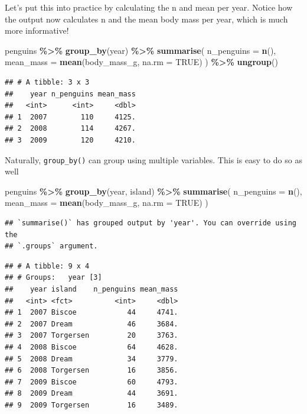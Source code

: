 \documentclass[
]{book}
\newenvironment{Shaded}{\begin{snugshade}}{\end{snugshade}}
\newcommand{\AttributeTok}[1]{\textcolor[rgb]{0.13,0.29,0.53}{#1}}
\newcommand{\ConstantTok}[1]{\textcolor[rgb]{0.56,0.35,0.01}{#1}}
\newcommand{\FunctionTok}[1]{\textcolor[rgb]{0.13,0.29,0.53}{\textbf{#1}}}
\newcommand{\NormalTok}[1]{#1}
\newcommand{\SpecialCharTok}[1]{\textcolor[rgb]{0.81,0.36,0.00}{\textbf{#1}}}
\begin{document}
Let's put this into practice by calculating the n and mean per year. Notice how the output now calculates n and the mean body mass per year, which is much more informative!

\begin{Shaded}
\begin{Highlighting}[]
\NormalTok{penguins }\SpecialCharTok{\%\textgreater{}\%}
  \FunctionTok{group\_by}\NormalTok{(year) }\SpecialCharTok{\%\textgreater{}\%}
  \FunctionTok{summarise}\NormalTok{(}
    \AttributeTok{n\_penguins =} \FunctionTok{n}\NormalTok{(),}
    \AttributeTok{mean\_mass =} \FunctionTok{mean}\NormalTok{(body\_mass\_g, }\AttributeTok{na.rm =} \ConstantTok{TRUE}\NormalTok{)}
\NormalTok{  ) }\SpecialCharTok{\%\textgreater{}\%}
  \FunctionTok{ungroup}\NormalTok{()}
\end{Highlighting}
\end{Shaded}

\begin{verbatim}
## # A tibble: 3 x 3
##    year n_penguins mean_mass
##   <int>      <int>     <dbl>
## 1  2007        110     4125.
## 2  2008        114     4267.
## 3  2009        120     4210.
\end{verbatim}

Naturally, \texttt{group\_by()} can group using multiple variables. This is easy to do so as well

\begin{Shaded}
\begin{Highlighting}[]
\NormalTok{penguins }\SpecialCharTok{\%\textgreater{}\%}
  \FunctionTok{group\_by}\NormalTok{(year, island) }\SpecialCharTok{\%\textgreater{}\%}
  \FunctionTok{summarise}\NormalTok{(}
    \AttributeTok{n\_penguins =} \FunctionTok{n}\NormalTok{(),}
    \AttributeTok{mean\_mass =} \FunctionTok{mean}\NormalTok{(body\_mass\_g, }\AttributeTok{na.rm =} \ConstantTok{TRUE}\NormalTok{)}
\NormalTok{  )}
\end{Highlighting}
\end{Shaded}

\begin{verbatim}
## `summarise()` has grouped output by 'year'. You can override using the
## `.groups` argument.
\end{verbatim}

\begin{verbatim}
## # A tibble: 9 x 4
## # Groups:   year [3]
##    year island    n_penguins mean_mass
##   <int> <fct>          <int>     <dbl>
## 1  2007 Biscoe            44     4741.
## 2  2007 Dream             46     3684.
## 3  2007 Torgersen         20     3763.
## 4  2008 Biscoe            64     4628.
## 5  2008 Dream             34     3779.
## 6  2008 Torgersen         16     3856.
## 7  2009 Biscoe            60     4793.
## 8  2009 Dream             44     3691.
## 9  2009 Torgersen         16     3489.
\end{verbatim}
\end{document}
